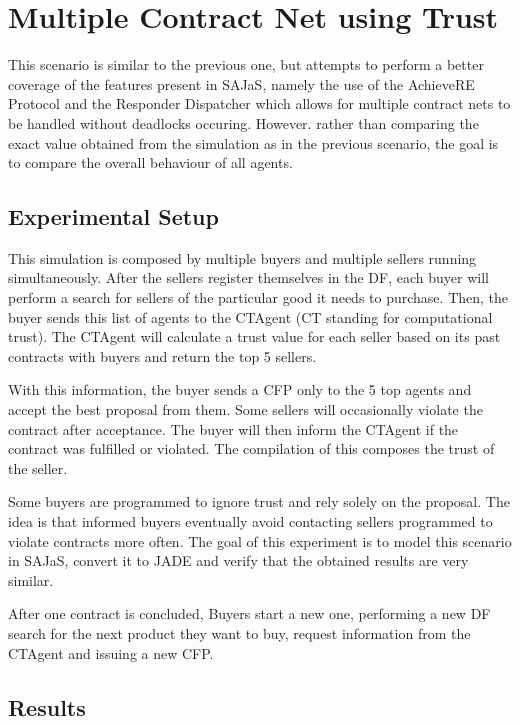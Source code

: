 \section{Multiple Contract Net using Trust}

This scenario is similar to the previous one, but attempts to perform a better coverage of the features present in SAJaS, namely the use of the AchieveRE Protocol and the Responder Dispatcher which allows for multiple contract nets to be handled without deadlocks occuring. However. rather than comparing the exact value obtained from the simulation as in the previous scenario, the goal is to compare the overall behaviour of all agents.

\subsection{Experimental Setup}
This simulation is composed by multiple buyers and multiple sellers running simultaneously. After the sellers register themselves in the DF, each buyer will perform a search for sellers of the particular good it needs to purchase. Then, the buyer sends this list of agents to the CTAgent (CT standing for computational trust). The CTAgent will calculate a trust value for each seller based on its past contracts with buyers and return the top 5 sellers.

With this information, the buyer sends a CFP only to the 5 top agents and accept the best proposal from them. Some sellers will occasionally violate the contract after acceptance. The buyer will then inform the CTAgent if the contract was fulfilled or violated. The compilation of this composes the trust of the seller.

Some buyers are programmed to ignore trust and rely solely on the proposal. The idea is that informed buyers eventually avoid contacting sellers programmed to violate contracts more often. The goal of this experiment is to model this scenario in SAJaS, convert it to JADE and verify that the obtained results are very similar.

After one contract is concluded, Buyers start a new one, performing a new DF search for the next product they want to buy, request information from the CTAgent and issuing a new CFP.

\subsection{Results}

